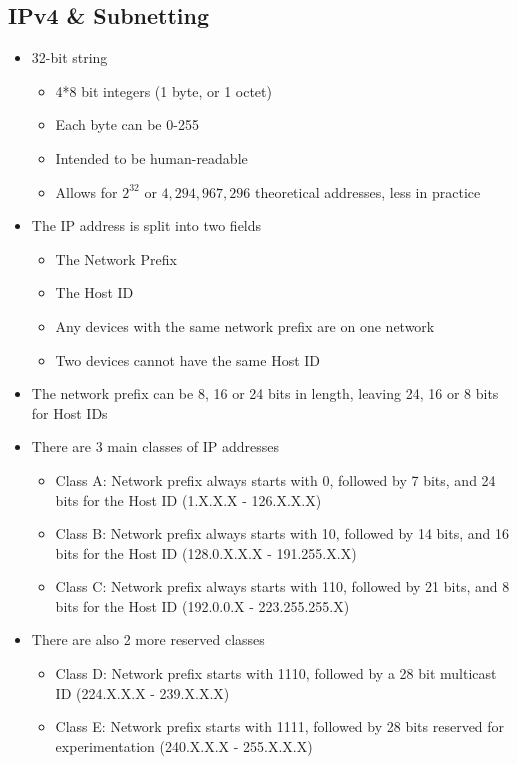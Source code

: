 \subsection*{IPv4 \& Subnetting}

\begin{itemize}
  \item 32-bit string
  \begin{itemize}
    \item 4*8 bit integers (1 byte, or 1 octet)
    \item Each byte can be 0-255
    \item Intended to be human-readable
    \item Allows for $2^{32}$ or $4,294,967,296$ theoretical addresses, less in practice
  \end{itemize}
  \item The IP address is split into two fields
  \begin{itemize}
    \item The Network Prefix
    \item The Host ID
    \item Any devices with the same network prefix are on one network
    \item Two devices cannot have the same Host ID
  \end{itemize}
  \item The network prefix can be 8, 16 or 24 bits in length, leaving 24, 16 or 8 bits for Host IDs
  \item There are 3 main classes of IP addresses
  \begin{itemize}
    \item Class A: Network prefix always starts with 0, followed by 7 bits, and 24 bits for the Host ID (1.X.X.X - 126.X.X.X)
    \item Class B: Network prefix always starts with 10, followed by 14 bits, and 16 bits for the Host ID (128.0.X.X.X - 191.255.X.X)
    \item Class C: Network prefix always starts with 110, followed by 21 bits, and 8 bits for the Host ID (192.0.0.X - 223.255.255.X)
  \end{itemize}
  \item There are also 2 more reserved classes
  \begin{itemize}
    \item Class D: Network prefix starts with 1110, followed by a 28 bit multicast ID (224.X.X.X - 239.X.X.X)
    \item Class E: Network prefix starts with 1111, followed by 28 bits reserved for experimentation (240.X.X.X - 255.X.X.X)

\end{itemize}
\end{itemize}
